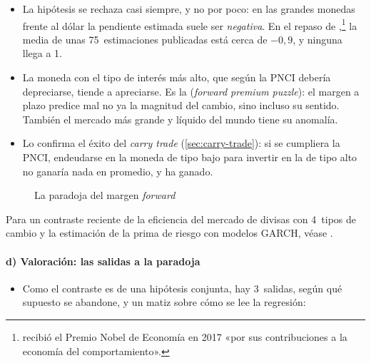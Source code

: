 \documentclass[11pt]{article}
\begin{document}
\begin{itemize}
\item La hipótesis se rechaza casi siempre, y no por poco: en las grandes monedas frente al dólar la pendiente estimada suele ser \emph{negativa}. En el repaso de \textcite{FrootThaler1990},\footnote{ recibió el Premio Nobel de Economía en 2017 «por sus contribuciones a la economía del comportamiento»\nocite{Nobel2017Thaler}.} la media de unas 75~estimaciones publicadas está cerca de $-0{,}9$, y ninguna llega a 1.
\item La moneda con el tipo de interés más alto, que según la PNCI debería depreciarse, tiende a apreciarse. Es la  (\emph{forward premium puzzle}): el margen a plazo predice mal no ya la magnitud del cambio, sino incluso su sentido\nocite{Engel1996Forward}. También el mercado más grande y líquido del mundo tiene su anomalía.
\item Lo confirma el éxito del \emph{carry trade} (\ref{sec:carry-trade}): si se cumpliera la PNCI, endeudarse en la moneda de tipo bajo para invertir en la de tipo alto no ganaría nada en promedio, y ha ganado.
\end{itemize}

\begin{figure}[H]
\centering
\caption{La paradoja del margen \emph{forward}}\label{fig:paradoja-forward}
\end{figure}

\begin{anotaciones}
Para un contraste reciente de la eficiencia del mercado de divisas con 4~tipos de cambio y la estimación de la prima de riesgo con modelos GARCH, véase \textcite{Kallianiotis2018Efficient}.
\end{anotaciones}

\paragraph{d) Valoración: las salidas a la paradoja}

\begin{itemize}
\item Como el contraste es de una hipótesis conjunta, hay 3~salidas, según qué supuesto se abandone, y un matiz sobre cómo se lee la regresión:
\end{itemize}
\end{document}
